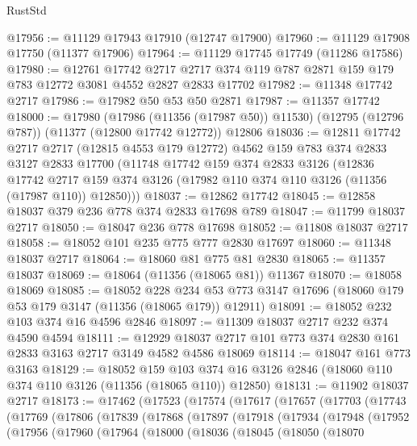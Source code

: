 \begin{lexlean}{RustStd}
\begin{coremodule}
@17956 := @11129 @17943 @17910 (@12747 @17900)
@17960 := @11129 @17908 @17750 (@11377 @17906)
@17964 := @11129 @17745 @17749 (@11286 @17586)
@17980 := @12761
    @17742
    @2717
    @2717
    @374
    @119
    @787
    @2871
    @159
    @179
    @783
    @12772
    @3081
    @4552
    @2827
    @2833
    @17702
@17982 := @11348 @17742 @2717
@17986 := @17982 @50 @53 @50 @2871
@17987 := @11357 @17742
@18000 := @17980
    (@17986 (@11356 (@17987 @50)) @11530)
    (@12795 (@12796 @787))
    (@11377 (@12800 @17742 @12772))
    @12806
@18036 := @12811
    @17742
    @2717
    @2717
    (@12815 @4553 @179 @12772)
    @4562
    @159
    @783
    @374
    @2833
    @3127
    @2833
    @17700
    (@11748
      @17742
      @159
      @374
      @2833
      @3126
      (@12836
        @17742
        @2717
        @159
        @374
        @3126
        (@17982 @110 @374 @110 @3126 (@11356 (@17987 @110)) @12850)))
@18037 := @12862 @17742
@18045 := @12858 @18037 @379 @236 @778 @374 @2833 @17698 @789
@18047 := @11799 @18037 @2717
@18050 := @18047 @236 @778 @17698
@18052 := @11808 @18037 @2717
@18058 := @18052 @101 @235 @775 @777 @2830 @17697
@18060 := @11348 @18037 @2717
@18064 := @18060 @81 @775 @81 @2830
@18065 := @11357 @18037
@18069 := @18064 (@11356 (@18065 @81)) @11367
@18070 := @18058 @18069
@18085 := @18052
    @228
    @234
    @53
    @773
    @3147
    @17696
    (@18060 @179 @53 @179 @3147 (@11356 (@18065 @179)) @12911)
@18091 := @18052 @232 @103 @374 @16 @4596 @2846
@18097 := @11309 @18037 @2717 @232 @374 @4590 @4594
@18111 := @12929 @18037 @2717 @101 @773 @374 @2830 @161 @2833 @3163 @2717 @3149 @4582 @4586 @18069
@18114 := @18047 @161 @773 @3163
@18129 := @18052
    @159
    @103
    @374
    @16
    @3126
    @2846
    (@18060 @110 @374 @110 @3126 (@11356 (@18065 @110)) @12850)
@18131 := @11902 @18037 @2717
@18173 := @17462
    (@17523
      (@17574
        (@17617
          (@17657
            (@17703
              (@17743
                (@17769
                  (@17806
                    (@17839
                      (@17868
                        (@17897
                          (@17918
                            (@17934
                              (@17948
                                (@17952
                                  (@17956
                                    (@17960
                                      (@17964
                                        (@18000
                                          (@18036
                                            (@18045
                                              (@18050
                                                (@18070

\end{coremodule}
\end{lexlean}
